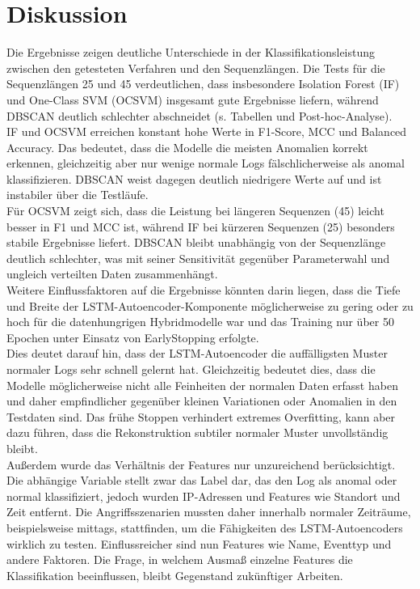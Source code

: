 \documentclass[a4paper,12pt]{article}
\begin{document}
	\section{Diskussion}
	Die Ergebnisse zeigen deutliche Unterschiede in der Klassifikationsleistung zwischen den getesteten Verfahren und den Sequenzlängen. Die Tests für die Sequenzlängen 25 und 45 verdeutlichen, dass insbesondere Isolation Forest (IF) und One-Class SVM (OCSVM) insgesamt gute Ergebnisse liefern, während DBSCAN deutlich schlechter abschneidet (s. Tabellen und Post-hoc-Analyse).
	\\[0.5em]
	IF und OCSVM erreichen konstant hohe Werte in F1-Score, MCC und Balanced Accuracy. Das bedeutet, dass die Modelle die meisten Anomalien korrekt erkennen, gleichzeitig aber nur wenige normale Logs fälschlicherweise als anomal klassifizieren. DBSCAN weist dagegen deutlich niedrigere Werte auf und ist instabiler über die Testläufe.
	\\[0.5em]
	Für OCSVM zeigt sich, dass die Leistung bei längeren Sequenzen (45) leicht besser in F1 und MCC ist, während IF bei kürzeren Sequenzen (25) besonders stabile Ergebnisse liefert. DBSCAN bleibt unabhängig von der Sequenzlänge deutlich schlechter, was mit seiner Sensitivität gegenüber Parameterwahl und ungleich verteilten Daten zusammenhängt.  
	\\[0.5em]
	Weitere Einflussfaktoren auf die Ergebnisse könnten darin liegen, dass die Tiefe und Breite der LSTM-Autoencoder-Komponente möglicherweise zu gering oder zu hoch für die datenhungrigen Hybridmodelle war und das Training nur über 50 Epochen unter Einsatz von EarlyStopping erfolgte.  
	\\[0.5em]
	Dies deutet darauf hin, dass der LSTM-Autoencoder die auffälligsten Muster normaler Logs sehr schnell gelernt hat. Gleichzeitig bedeutet dies, dass die Modelle möglicherweise nicht alle Feinheiten der normalen Daten erfasst haben und daher empfindlicher gegenüber kleinen Variationen oder Anomalien in den Testdaten sind. Das frühe Stoppen verhindert extremes Overfitting, kann aber dazu führen, dass die Rekonstruktion subtiler normaler Muster unvollständig bleibt.  
	\\[0.5em]
	Außerdem wurde das Verhältnis der Features nur unzureichend berücksichtigt. Die abhängige Variable stellt zwar das Label dar, das den Log als anomal oder normal klassifiziert, jedoch wurden IP-Adressen und Features wie Standort und Zeit entfernt. Die Angriffsszenarien mussten daher innerhalb normaler Zeiträume, beispielsweise mittags, stattfinden, um die Fähigkeiten des LSTM-Autoencoders wirklich zu testen. Einflussreicher sind nun Features wie Name, Eventtyp und andere Faktoren. Die Frage, in welchem Ausmaß einzelne Features die Klassifikation beeinflussen, bleibt Gegenstand zukünftiger Arbeiten.  
\end{document}
